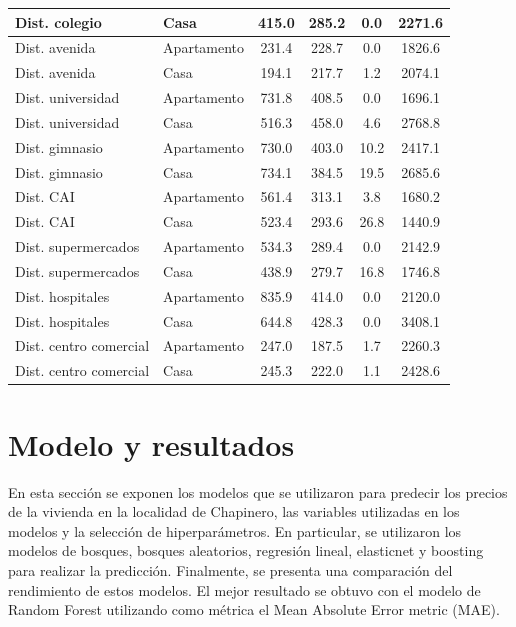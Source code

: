 \documentclass[
  11pt,
  letterpaper,
]{article}
\begin{document}
\begin{table}[!h]
\begin{tabular}[t]{l|l|c|c|c|c}
\hline
Dist. colegio & Casa & 415.0 & 285.2 & 0.0 & 2271.6\\
\hline
Dist. avenida & Apartamento & 231.4 & 228.7 & 0.0 & 1826.6\\
\hline
Dist. avenida & Casa & 194.1 & 217.7 & 1.2 & 2074.1\\
\hline
Dist. universidad & Apartamento & 731.8 & 408.5 & 0.0 & 1696.1\\
\hline
Dist. universidad & Casa & 516.3 & 458.0 & 4.6 & 2768.8\\
\hline
Dist. gimnasio & Apartamento & 730.0 & 403.0 & 10.2 & 2417.1\\
\hline
Dist. gimnasio & Casa & 734.1 & 384.5 & 19.5 & 2685.6\\
\hline
Dist. CAI & Apartamento & 561.4 & 313.1 & 3.8 & 1680.2\\
\hline
Dist. CAI & Casa & 523.4 & 293.6 & 26.8 & 1440.9\\
\hline
Dist. supermercados & Apartamento & 534.3 & 289.4 & 0.0 & 2142.9\\
\hline
Dist. supermercados & Casa & 438.9 & 279.7 & 16.8 & 1746.8\\
\hline
Dist. hospitales & Apartamento & 835.9 & 414.0 & 0.0 & 2120.0\\
\hline
Dist. hospitales & Casa & 644.8 & 428.3 & 0.0 & 3408.1\\
\hline
Dist. centro comercial & Apartamento & 247.0 & 187.5 & 1.7 & 2260.3\\
\hline
Dist. centro comercial & Casa & 245.3 & 222.0 & 1.1 & 2428.6\\
\hline
\end{tabular}
\end{table}

\hypertarget{modelo-y-resultados}{%
\section{Modelo y resultados}\label{modelo-y-resultados}}

En esta sección se exponen los modelos que se utilizaron para predecir los precios de la vivienda en la localidad de Chapinero, las variables utilizadas en los modelos y la selección de hiperparámetros. En particular, se utilizaron los modelos de bosques, bosques aleatorios, regresión lineal, elasticnet y boosting para realizar la predicción. Finalmente, se presenta una comparación del rendimiento de estos modelos. El mejor resultado se obtuvo con el modelo de Random Forest utilizando como métrica el Mean Absolute Error metric (MAE).
\end{document}
